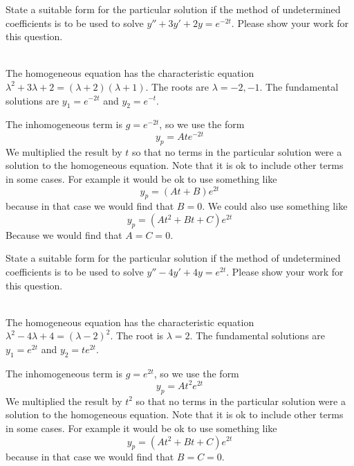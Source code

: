 \ifnum {}
\question[2] State a suitable form for the particular solution if the method of undetermined coefficients is to be used to solve  $y'' + 3y' + 2y=e^{-2t}$. Please show your work for this question. 
\ifnum {} {\color{DarkBlue} \\[12pt] 
The homogeneous equation has the characteristic equation $\lambda^2 + 3\lambda + 2 = (\lambda + 2)(\lambda+1)$. The roots are $\lambda = -2, -1$. The fundamental solutions are $y_1 = e^{-2t}$ and $y_2 = e^{-t}$. 

The inhomogeneous term is $g = e^{-2t}$, so we use the form $$y_p = Ate^{-2t}$$ We multiplied the result by $t$ so that no terms in the particular solution were a solution to the homogeneous equation. Note that it is ok to include other terms in some cases. For example it would be ok to use something like
$$y_p = (At+B)e^{2t}$$
because in that case we would find that $B=0$. We could also use something like 
$$y_p = (At^2+Bt+C)e^{2t}$$
Because we would find that $A=C=0$. 
} 
\else 
\vfill
\fi
\fi 

\ifnum {}
\question[2] State a suitable form for the particular solution if the method of undetermined coefficients is to be used to solve  $y'' - 4y' + 4y=e^{2t}$. Please show your work for this question. 
\ifnum {} {\color{DarkBlue} \\[12pt] 
The homogeneous equation has the characteristic equation $\lambda^2 - 4\lambda + 4 = (\lambda -2)^2$. The root is $\lambda = 2$. The fundamental solutions are $y_1 = e^{2t}$ and $y_2 = te^{2t}$. 

The inhomogeneous term is $g = e^{2t}$, so we use the form $$y_p = At^2e^{2t}$$ We multiplied the result by $t^2$ so that no terms in the particular solution were a solution to the homogeneous equation. Note that it is ok to include other terms in some cases. For example it would be ok to use something like
$$y_p = (At^2+Bt+C)e^{2t}$$
because in that case we would find that $B=C=0$. 
} 
\else 
\vfill
\fi
\fi 



